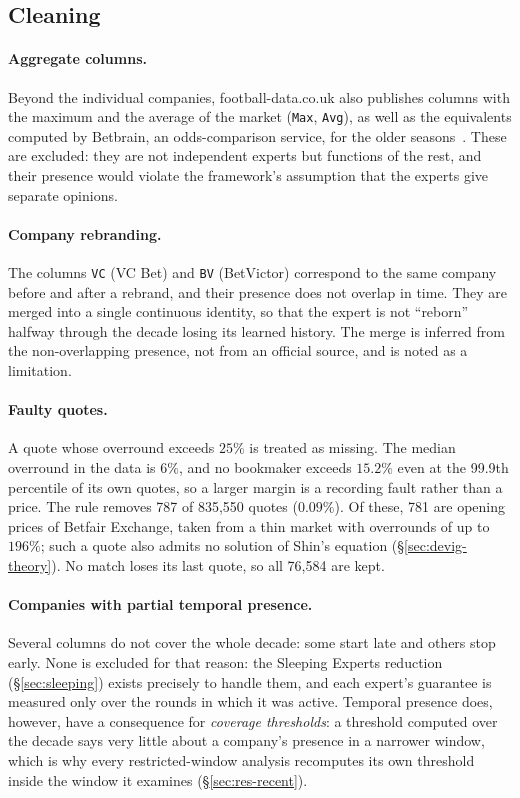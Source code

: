 \documentclass[12pt,a4paper,oneside]{report}
\newcommand{\file}[1]{\texttt{#1}}
\renewcommand{\_}{\oldunderscore\allowbreak}
\theoremstyle{definition}
\theoremstyle{plain}
\theoremstyle{definition}   %
\begin{document}
\subsection{Cleaning}
\label{sec:data-clean}

\paragraph{Aggregate columns.} Beyond the individual companies, football-data.co.uk also
publishes columns with the maximum and the average of the market (\file{Max}, \file{Avg}), as
well as the equivalents computed by Betbrain, an odds-comparison service, for the older
seasons~\cite{footballdata}. These are excluded: they are not
independent experts but functions of the rest, and their presence would violate the framework's
assumption that the experts give separate opinions.

\paragraph{Company rebranding.} The columns \file{VC} (VC Bet) and \file{BV} (BetVictor)
correspond to the same company before and after a rebrand, and their presence does not overlap in
time. They are merged into a single continuous identity, so that the expert is not ``reborn''
halfway through the decade losing its learned history. The merge is inferred from the
non-overlapping presence, not from an official source, and is noted as a limitation.

\paragraph{Faulty quotes.} A quote whose overround exceeds $25\%$ is treated as missing. The median
overround in the data is $6\%$, and no bookmaker exceeds $15.2\%$ even at the 99.9th percentile of
its own quotes, so a larger margin is a recording fault rather than a price. The rule removes 787
of 835,550 quotes ($0.09\%$). Of these, 781 are opening prices of Betfair Exchange, taken from a
thin market with overrounds of up to $196\%$; such a quote also admits no solution of Shin's
equation (\S\ref{sec:devig-theory}). No match loses its last quote, so all 76,584 are kept.

\paragraph{Companies with partial temporal presence.} Several columns do not cover the whole
decade: some start late and others stop early. None is excluded for that reason: the Sleeping
Experts reduction (\S\ref{sec:sleeping}) exists precisely to handle them, and each expert's
guarantee is measured only over the rounds in which it was active. Temporal presence does,
however, have a consequence for \emph{coverage thresholds}: a threshold computed over the
decade says very little about a company's presence in a narrower window, which is why every
restricted-window analysis recomputes its own threshold inside the window it examines
(\S\ref{sec:res-recent}).
\end{document}
